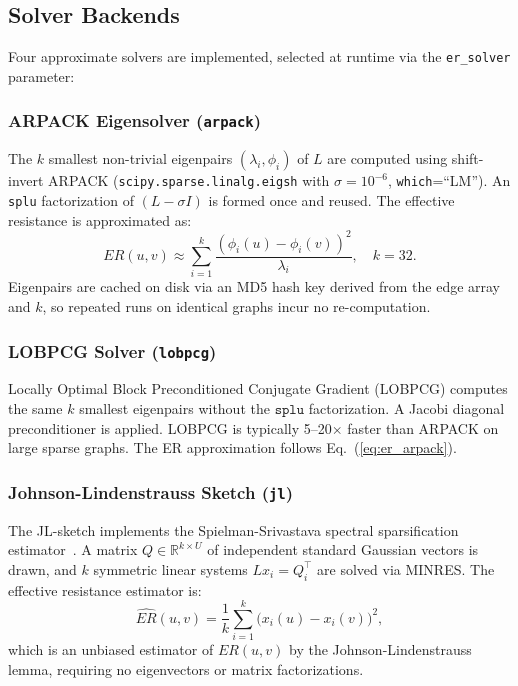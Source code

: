 \subsection{Solver Backends}

Four approximate solvers are implemented, selected at runtime via the \texttt{er\_solver} parameter:

\subsubsection*{ARPACK Eigensolver (\texttt{arpack})}

The $k$ smallest non-trivial eigenpairs $(\lambda_i, \phi_i)$ of $L$ are computed using shift-invert ARPACK (\texttt{scipy.sparse.linalg.eigsh} with $\sigma = 10^{-6}$, \texttt{which}=``LM''). An \texttt{splu} factorization of $(L - \sigma I)$ is formed once and reused. The effective resistance is approximated as:
\begin{equation}
    ER(u,v) \approx \sum_{i=1}^{k} \frac{(\phi_i(u) - \phi_i(v))^2}{\lambda_i}, \quad k=32.
    \label{eq:er_arpack}
\end{equation}
Eigenpairs are cached on disk via an MD5 hash key derived from the edge array and $k$, so repeated runs on identical graphs incur no re-computation.

\subsubsection*{LOBPCG Solver (\texttt{lobpcg})}

Locally Optimal Block Preconditioned Conjugate Gradient (LOBPCG) computes the same $k$ smallest eigenpairs without the $\texttt{splu}$ factorization. A Jacobi diagonal preconditioner is applied. LOBPCG is typically 5--20$\times$ faster than ARPACK on large sparse graphs. The ER approximation follows Eq.~(\ref{eq:er_arpack}).

\subsubsection*{Johnson-Lindenstrauss Sketch (\texttt{jl})}

The JL-sketch implements the Spielman-Srivastava spectral sparsification estimator~\cite{spielman2011spectral}. A matrix $Q \in \mathbb{R}^{k \times U}$ of independent standard Gaussian vectors is drawn, and $k$ symmetric linear systems $L x_i = Q_i^\top$ are solved via MINRES. The effective resistance estimator is:
\begin{equation}
    \widehat{ER}(u,v) = \frac{1}{k}\sum_{i=1}^{k} \bigl(x_i(u) - x_i(v)\bigr)^2,
    \label{eq:er_jl}
\end{equation}
which is an unbiased estimator of $ER(u,v)$ by the Johnson-Lindenstrauss lemma, requiring no eigenvectors or matrix factorizations.

